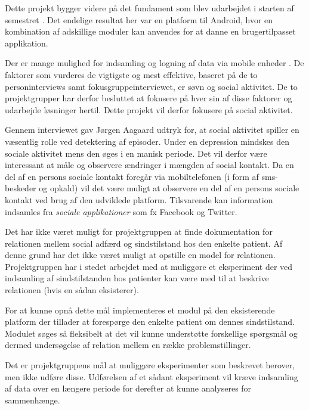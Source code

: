 Dette projekt bygger videre på det fundament som blev udarbejdet i starten af semestret \citefaelles{}.
Det endelige resultat her var en platform til Android, hvor en kombination af adskillige moduler kan anvendes for at danne en brugertilpasset applikation.

Der er mange mulighed  for indsamling og logning af data via mobile enheder .
De faktorer som vurderes de vigtigste og mest effektive, baseret på de to personinterviews samt fokusgruppeinterviewet, er søvn og social aktivitet.
De to projektgrupper har derfor besluttet at fokusere på hver sin af disse faktorer og udarbejde løsninger hertil.
Dette projekt vil derfor fokusere på social aktivitet.

Gennem interviewet gav Jørgen Aagaard udtryk for, at social aktivitet spiller en væsentlig rolle ved detektering af episoder.
Under en depression mindskes den sociale aktivitet mens den øges i en manisk periode.
Det vil derfor være interessant at måle og observere ændringer i mængden af social kontakt.
Da en del af en persons sociale kontakt foregår via mobiltelefonen (i form af sms-beskeder og opkald) vil det være muligt at observere en del af en persons sociale kontakt ved brug af den udviklede platform.
Tilsvarende kan information indsamles fra \textit{sociale applikationer} som fx Facebook og Twitter.

Det har ikke været muligt for projektgruppen at finde dokumentation for relationen mellem social adfærd og sindstilstand hos den enkelte patient.
Af denne grund har det ikke været muligt at opstille en model for relationen.
Projektgruppen har i stedet arbejdet med at muliggøre et eksperiment der ved indsamling af sindstilstanden hos patienter kan være med til at beskrive relationen (hvis en sådan eksisterer).

For at kunne opnå dette mål implementeres et modul på den eksisterende platform \citefaelles{} der tillader at forespørge den enkelte patient om dennes sindstilstand.
Modulet søges så fleksibelt at det vil kunne understøtte forskellige spørgsmål og dermed undersøgelse af relation mellem en række problemstillinger.

Det er projektgruppens mål at muliggøre eksperimenter som beskrevet herover, men ikke udføre disse.
Udførelsen af et sådant eksperiment vil kræve indsamling af data over en længere periode for derefter at kunne analyseres for sammenhænge.